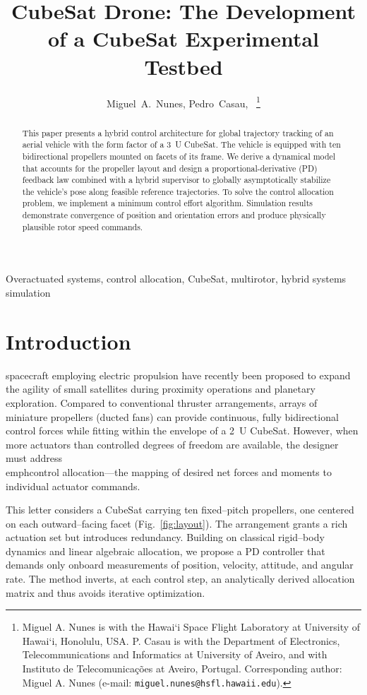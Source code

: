\documentclass[journal]{IEEEtran}
\title{CubeSat Drone: The Development of a CubeSat Experimental Testbed}
\author{Miguel~A.~Nunes, Pedro~Casau,~\IEEEmembership{Member,~IEEE}%
\thanks{Miguel A. Nunes is with the Hawai‘i Space Flight Laboratory at University of Hawai‘i, Honolulu, USA. P. Casau is with the Department of Electronics, Telecommunications and Informatics at University of Aveiro, and with Instituto de Telecomunicações at Aveiro, Portugal. Corresponding author: Miguel A. Nunes (e-mail: \texttt{miguel.nunes@hsfl.hawaii.edu}).}%
}
\begin{document}
\maketitle

\begin{abstract}
This paper presents a hybrid control architecture for global trajectory tracking of an aerial vehicle with the form factor of a \qty{3}{U} CubeSat. 
The vehicle is equipped with ten bidirectional propellers mounted on facets of its frame. 
We derive a dynamical model that accounts for the propeller layout and design a proportional-derivative (PD) feedback law combined with a hybrid supervisor to globally asymptotically stabilize the vehicle's pose along feasible reference trajectories. 
To solve the control allocation problem, we implement a minimum control effort algorithm.
Simulation results demonstrate convergence of position and orientation errors and produce physically plausible rotor speed commands.
\end{abstract}

\begin{IEEEkeywords}
Overactuated systems, control allocation, CubeSat, multirotor, hybrid systems simulation
\end{IEEEkeywords}

\section{Introduction}
 spacecraft employing electric propulsion have recently been proposed to expand the agility of small satellites during proximity operations and planetary exploration. Compared to conventional thruster arrangements, arrays of miniature propellers (ducted fans) can provide continuous, fully bidirectional control forces while fitting within the  envelope of a \qty{2}{U} CubeSat. However, when more actuators than controlled degrees of freedom are available, the designer must address \\emph{control allocation}---the mapping of desired net forces and moments to individual actuator commands.

This letter considers a CubeSat carrying ten fixed--pitch propellers, one centered on each outward--facing facet (Fig.~\ref{fig:layout}). The arrangement grants a rich actuation set but introduces redundancy. Building on classical rigid--body dynamics and linear algebraic allocation, we propose a PD controller that demands only onboard measurements of position, velocity, attitude, and angular rate. The method inverts, at each control step, an analytically derived allocation matrix and thus avoids iterative optimization.
\end{document}
